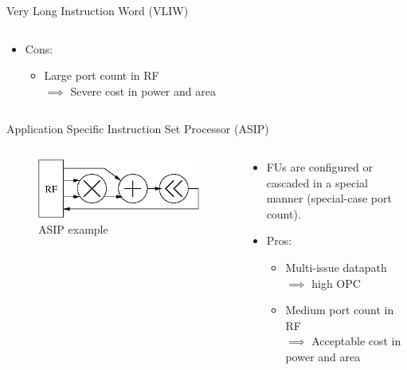 \documentclass{beamer}
\begin{document}
\begin{CJK}{UTF8}{bkai}
\begin{frame}{Very Long Instruction Word (VLIW)}
\begin{columns}
\begin{column}{0.6\textwidth}
\begin{itemize}
\begin{itemize}
                      \end{itemize}
                 \item Cons:
                     \begin{itemize}
                         \item Large port count in RF \\ $\implies$ Severe cost in power and area
                     \end{itemize}
              \end{itemize} 
           \end{column}
       \end{columns} 
    \end{frame}

    \begin{frame}{Application Specific Instruction Set Processor (ASIP)}
        \begin{columns}
            \begin{column}{0.4\textwidth}
                \begin{figure}[!ht]
                    \centering
                    \includegraphics[width=0.9\linewidth]{./figs/cascade.eps}
                    \caption{ASIP example}
                \end{figure}
            \end{column}
            \begin{column}{0.6\textwidth}
               \begin{itemize}
                   \item FUs are configured or cascaded in a special manner (special-case port count).
                   \item Pros:
                       \begin{itemize}
                           \item Multi-issue datapath \\ $\implies$ high OPC
                           \item Medium port count in RF \\ $\implies$ Acceptable cost in power and area

\end{itemize}
\end{itemize}
\end{column}
\end{columns}
\end{frame}
\end{CJK}
\end{document}
